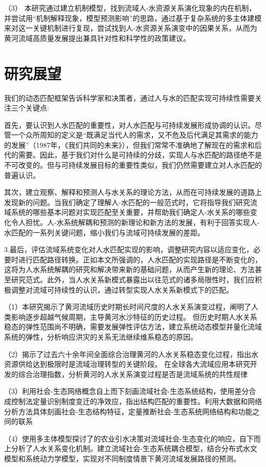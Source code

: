 （3） 本研究通过建立机制模型，找到流域人-水资源关系演化现象的内在机制，并尝试用“机制解释现象，模型预测影响”的思路，通过基于复杂系统的多主体建模来对这一关键机制进行复现，尝试找到人-水资源关系演变中的因果关系，从而为黄河流域高质量发展提出兼具针对性和科学性的政策建议。

\section{研究展望}

我们的动态匹配框架告诉科学家和决策者，通过人与水的匹配实现可持续性需要关注三个关键点:

首先，要认识到人水匹配的重要性，对人水匹配与可持续发展形成协调的认识。尽管一个众所周知的定义是“既满足当代人的需求，又不危及后代满足其需求的能力的发展”（1987年，《我们共同的未来》），但我们常常不准确地了解现在的需求和后代的需要。因此，基于我们对什么是可持续的分歧，实现人与水匹配的路径绝不是不可改变的。但与可持续发展目标的重要性类似，我们仍然需要建立对人水匹配的普遍认识。

其次，建立观察、解释和预测人与水关系的理论方法，从而在可持续发展的道路上发现新的问题。当我们确定了理解人-水匹配的一般范式时，它将指导我们研究流域系统的哪些基本问题对实现匹配至关重要，并帮助我们确定人-水关系的哪些变化令人担忧。人-水系统解耦和预测的新理论和新方法的发展，有利于回答实现人-水匹配的一系列关键问题，缩小我们与流域可持续发展的差距。

3.最后，评估流域系统变化对人水匹配实现的影响，调整研究内容以适应变化，必要时进行匹配路径转换。正如本文所强调的，人水匹配的实现路径是不断变化的，这将为人水系统解耦的研究和解决带来新的基础问题，从而产生新的理论、方法甚至研究范式。此外，当人水关系新模式暴露出以往范式的诸多局限性时，我们应积极调整对流域可持续性的认识，通过转型实现人水关系新模式下的匹配。

（1）本研究揭示了黄河流域历史时期长时间尺度的人水关系演变过程，阐明了人类影响逐步超越气候周期，主导黄河水沙特征的历史过程。
但历史时期人水关系稳态的弹性范围尚不明确，需要发展弹性评估方法，建立系统动态模型并量化流域系统的弹性，分析响应洪灾的关系无法继续维系稳态的原因。

（2）揭示了过去六十余年间全面综合治理黄河的人水关系稳态变化过程，指出水资源供给达到极限时是流域治理转型的关键阶段。
在全球各大流域应用本研究开发的综合治理指数，分析黄河的人水关系演变过程是否是流域系统的共性规律


（3）利用社会-生态网络概念自上而下刻画流域社会-生态系统结构，使用差分合成控制法定量识别制度变迁的净效应，指出结构匹配的重要性。利用大数据和网络分析方法具体刻画社会-生态结构特征，定量推断社会-生态系统网络结构和功能之间的联系

（4）使用多主体模型探讨了的农业引水决策对流域社会-生态变化的响应，自下而上分析了人水关系变化机制。建立流域社会-生态系统耦合模型，结合分布式水文模型和系统动力学模型，实现对不同制度情景下黄河流域发展路径的预测。
